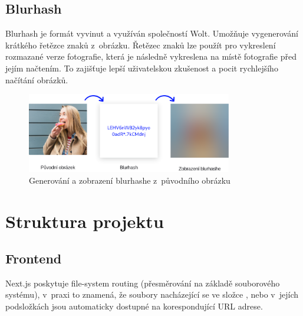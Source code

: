 \documentclass[12pt, a4paper,
  oneside,      %
]{report}
\begin{document}
\section{Blurhash}\label{subsection:blurhash}
Blurhash je formát vyvinut a využíván společností Wolt. Umožňuje vygenerování krátkého řetězce znaků z~obrázku. Řetězec znaků lze použít pro vykreslení rozmazané verze fotografie, která je následně vykreslena na místě fotografie před jejím načtením. To zajišťuje lepší uživatelskou zkušenost a pocit rychlejšího načítání obrázků. \cite{blurhash}\cite{blurhashWoltBlog}

\begin{figure}[h]
	\centering
	\includegraphics[width=0.8\textwidth]{images/blurhash.png}
	\caption{Generování a zobrazení blurhashe z~původního obrázku \cite{blurhashScreenshot}}
\end{figure}

\chapter{Struktura projektu}
\section{Frontend}\label{subsection:fileSystemRouting}
Next.js poskytuje file-system routing (přesměrování na základě souborového systému), v~praxi to znamená, že soubory nacházející se ve složce , nebo v~jejích podsložkách jsou automaticky dostupné na korespondující URL adrese.
\end{document}
